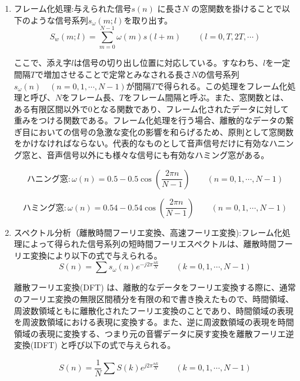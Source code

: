 \begin{enumerate}
\item フレーム化処理:与えられた信号$s(n)$ に長さ$N$ の窓関数を掛けることで以下のような信号系列$s_\omega(m; l)$を取り出す。
\begin{equation}
S_w(m;l)=\sum_{m=0}^{N-1}\omega(m)s(l+m)\qquad(l=0,T,2T,\cdots)
\end{equation}

ここで、添え字$l$は信号の切り出し位置に対応している。すなわち、$l$を一定間隔$T$で増加させることで定常とみなされる長さ$N$の信号系列$s_\omega(n)\quad (n=0,1,\cdots,N-1)$が間隔$T$で得られる。この処理をフレーム化処理と呼び、$N$をフレーム長、$T$をフレーム間隔と呼ぶ。また、窓関数とは、ある有限区間以外で0となる関数であり、フレーム化されたデータに対して重みをつける関数である。フレーム化処理を行う場合、離散的なデータの繋ぎ目においての信号の急激な変化の影響を和らげるため、原則として窓関数をかけなければならない。代表的なものとして音声信号だけに有効なハニング窓と、音声信号以外にも様々な信号にも有効なハミング窓がある。

\begin{equation}
\label{da1}
ハニング窓:\omega(n)=0.5-0.5\cos(\frac{2\pi n}{N-1})\qquad(n=0,1,\cdots,N-1)
\end{equation}

\begin{equation}
\label{da2}
ハミング窓:\omega(n)=0.54-0.54\cos(\frac{2\pi n}{N-1})\qquad(n=0,1,\cdots,N-1)
\end{equation}

\item スペクトル分析（離散時間フーリエ変換、高速フーリエ変換):フレーム化処理によって得られた信号系列の短時間フーリエスペクトルは、離散時間フーリエ変換により以下の式で与えられる。
\begin{equation}
S(n)=\sum s_\omega(n)e^{-j2\pi \frac{nk}{N}} \qquad (k=0,1,\cdots,N-1)
\end{equation}

離散フーリエ変換(DFT) は、離散的なデータをフーリエ変換する際に、通常のフーリエ変換の無限区間積分を有限の和で書き換えたもので、時間領域、周波数領域ともに離散化されたフーリエ変換のことであり、時間領域の表現を周波数領域における表現に変換する。また、逆に周波数領域の表現を時間領域の表現に変換する、つまり元の音響データに戻す変換を離散フーリエ逆変換(IDFT) と呼び以下の式で与えられる。

\begin{equation}
S(n)=\frac{1}{N}\sum S(k)e^{j2\pi \frac{nk}{N}} \qquad (k=0,1,\cdots,N-1)
\end{equation}


\end{enumerate}
